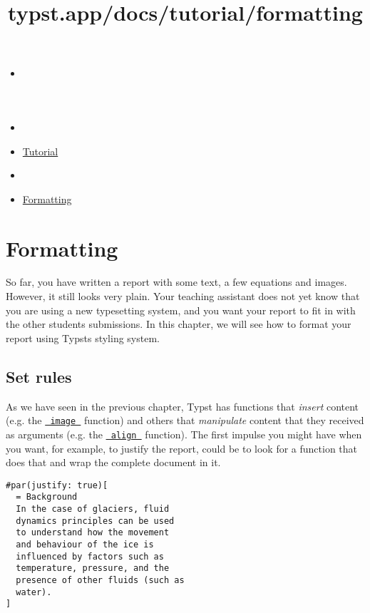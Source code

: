 \title{typst.app/docs/tutorial/formatting}

\begin{itemize}
\tightlist
\item
  \href{/docs}{}
\item
  
\item
  \href{/docs/tutorial/}{Tutorial}
\item
  
\item
  \href{/docs/tutorial/formatting/}{Formatting}
\end{itemize}

\section{Formatting}\label{formatting}

So far, you have written a report with some text, a few equations and
images. However, it still looks very plain. Your teaching assistant does
not yet know that you are using a new typesetting system, and you want
your report to fit in with the other student\textquotesingle s
submissions. In this chapter, we will see how to format your report
using Typst\textquotesingle s styling system.

\subsection{Set rules}\label{set-rules}

As we have seen in the previous chapter, Typst has functions that
\emph{insert} content (e.g. the
\href{/docs/reference/visualize/image/}{\texttt{\ image\ }} function)
and others that \emph{manipulate} content that they received as
arguments (e.g. the
\href{/docs/reference/layout/align/}{\texttt{\ align\ }} function). The
first impulse you might have when you want, for example, to justify the
report, could be to look for a function that does that and wrap the
complete document in it.

\begin{verbatim}
#par(justify: true)[
  = Background
  In the case of glaciers, fluid
  dynamics principles can be used
  to understand how the movement
  and behaviour of the ice is
  influenced by factors such as
  temperature, pressure, and the
  presence of other fluids (such as
  water).
]
\end{verbatim}

